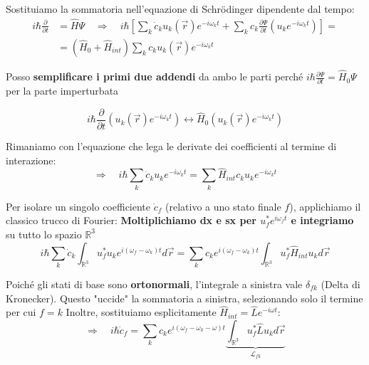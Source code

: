 \documentclass[11pt, a4paper]{article}
\begin{document}
Sostituiamo la sommatoria nell'equazione di Schrödinger dipendente dal tempo: %
\begin{align*}
    i\hbar \frac{\partial}{\partial t} &= \hat{H} \Psi \quad \Rightarrow \quad i\hbar \left[ \sum_k \dot{c}_k u_k(\vec{r}) e^{-i\omega_k t} + \sum_k c_k \frac{\partial \Psi}{\partial t} (u_k e^{-i\omega_k t} )\right] = \\ %
    &= (\hat{H}_0 + \hat{H}_{int}) \sum_k c_k u_k(\vec{r}) e^{-i\omega_k t} %
\end{align*}

\noindent
Posso \textbf{semplificare i primi due addendi} da ambo le parti perché $i\hbar \frac{\partial \Psi}{\partial t} = \hat{H}_0 \Psi$ per la parte imperturbata %

\begin{equation*}
    i\hbar \frac{\partial}{\partial t} (u_k(\vec{r}) e^{-i\omega_k t}) \leftrightarrow \hat{H}_0 (u_k(\vec{r}) e^{-i\omega_k t}) %
\end{equation*}

Rimaniamo con l'equazione che lega le derivate dei coefficienti al termine di interazione: %
\begin{equation}
    \Rightarrow \quad i\hbar \sum_k \dot{c}_k u_k e^{-i\omega_k t} = \sum_k \hat{H}_{int} c_k u_k e^{-i\omega_k t} %
\end{equation}

\noindent
Per isolare un singolo coefficiente $\dot{c}_f$ (relativo a uno stato finale $f$), applichiamo il classico trucco di Fourier: \textbf{Moltiplichiamo dx e sx per $u_f^* e^{i\omega_f t}$ e integriamo} su tutto lo spazio $\mathbb{R}^3$ %
\begin{equation*}
    i\hbar \sum_k \dot{c}_k \int_{\mathbb{R}^3} u_f^* u_k e^{i(\omega_f - \omega_k)t} d\vec{r} = \sum_k c_k e^{i(\omega_f - \omega_k)t} \int_{\mathbb{R}^3} u_f^* \hat{H}_{int} u_k d\vec{r} %
\end{equation*}

\noindent
Poiché gli stati di base sono \textbf{ortonormali}, l'integrale a sinistra vale $\delta_{fk}$ (Delta di Kronecker). Questo "uccide" la sommatoria a sinistra, selezionando solo il termine per cui $f=k$ %
Inoltre, sostituiamo esplicitamente $\hat{H}_{int} = \hat{L} e^{-i\omega t}$: %
\begin{equation}
    \Rightarrow \quad i\hbar \dot{c}_f = \sum_k c_k e^{i(\omega_f - \omega_k - \omega)t} \underbrace{ \int_{\mathbb{R}^3} u_f^* \hat{L} u_k d\vec{r} }_{\mathcal{L}_{fk}} %
\end{equation}
\end{document}
